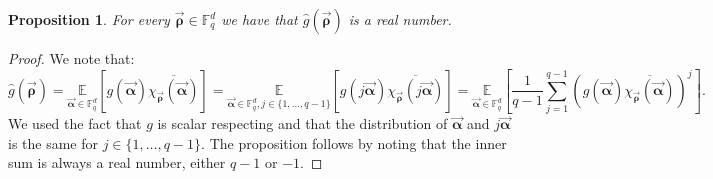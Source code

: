 \documentclass[11pt]{article}
\newcommand{\F}{\mathbb{F}}
\newtheorem{proposition}[theorem]{Proposition}
\newcommand{\alphab}{\vec{\bm{\alpha}}}
\newcommand{\rhob}{\vec{\bm{\rho}}}
\begin{document}
\begin{proposition}
For every $\rhob\in\F_q^d$ we have that $\hat{g}(\rhob)$ is a real number.
\end{proposition}\begin{proof} We note that:
$$
\hat{g}(\rhob) %
=\underset{\alphab\in\F_q^d}{\mathbb{E}}[g(\alphab)\overline{\chi_{\rhob}(\alphab)}]
= \underset{\alphab\in\F_q^d, j \in \{1,\ldots,q-1\}}{\mathbb{E}}[g(j\alphab)\overline{\chi_{\rhob}(j\alphab)}]
= \underset{\alphab\in\F_q^d }{\mathbb{E}}\left[ \frac{1}{q-1} \sum_{j=1}^{q-1}  (g(\alphab)\overline{\chi_{\rhob}(\alphab)})^j\right].  
$$
We used the fact that $g$ is scalar respecting and that the distribution of
$\alphab$ and $j \alphab$ is the same for $j \in \{1,\ldots,q-1\}$. The proposition follows by noting that 
the inner sum is always a real number, either $q-1$ or $-1$. 
\end{proof}
\end{document}
